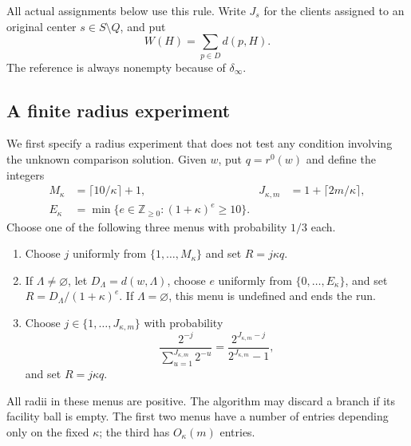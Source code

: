 All actual assignments below use this rule.  Write $J_s$ for the clients
assigned to an original center $s\in S\setminus Q$, and put
\[
 W(H)=\sum_{p\in D}d(p,H).
\]
The reference is always nonempty because of $\delta_\infty$.

\subsection{A finite radius experiment}

We first specify a radius experiment that does not test any condition
involving the unknown comparison solution.  Given $w$, put $q=r^0(w)$ and
define the integers
\[
 \begin{aligned}
 M_\kappa&=\lceil10/\kappa\rceil+1,&
 J_{\kappa,m}&=1+\lceil2m/\kappa\rceil,\\
 E_\kappa&=\min\{e\in\mathbb Z_{\ge0}:(1+\kappa)^e\ge10\}.
 \end{aligned}
\]
Choose one of the following three menus with probability $1/3$ each.
\begin{enumerate}[label=\textup{(\arabic*)}]
\item Choose $j$ uniformly from $\{1,\ldots,M_\kappa\}$ and set
      $R=j\kappa q$.
\item If $\Lambda\ne\varnothing$, let $D_\Lambda=d(w,\Lambda)$,
      choose $e$ uniformly from $\{0,\ldots,E_\kappa\}$, and set
      $R=D_\Lambda/(1+\kappa)^e$.  If $\Lambda=\varnothing$, this menu
      is undefined and ends the run.
\item Choose $j\in\{1,\ldots,J_{\kappa,m}\}$ with probability
      \[
       \frac{2^{-j}}{\sum_{u=1}^{J_{\kappa,m}}2^{-u}}
       =\frac{2^{J_{\kappa,m}-j}}{2^{J_{\kappa,m}}-1},
      \]
      and set $R=j\kappa q$.
\end{enumerate}
All radii in these menus are positive.  The algorithm may discard a branch
if its facility ball is empty.  The first two menus have a number of entries
depending only on the fixed $\kappa$; the third has $O_\kappa(m)$ entries.

